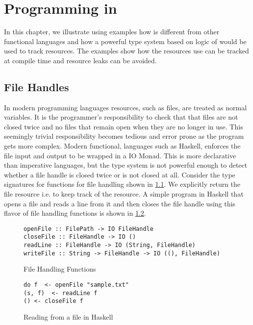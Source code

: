 \chapter{Programming in \qub{}}\label{chp:qub-programming}

In this chapter, we illustrate using examples how \qub{} is different
from other functional languages and how a powerful type system based on logic of \BI{}
would be used to track resources. The examples show how the resources use
can be tracked at compile time and resource leaks can be avoided.

\section{File Handles}\label{sec:file-handle-example}

In modern programming languages resources, such as files, are treated as normal variables.
It is the programmer's responsibility to check that that files are not closed twice
and no files that remain open when they are no longer in use. This seemingly trivial
responsibility becomes tedious and error prone as the program gets more complex.
Modern functional, languages such as Haskell, enforces the file input and output to be wrapped in a IO Monad.
This is more declarative than imperative languages, but the type system is not powerful enough
to detect whether a file handle is closed twice or is not closed at all.
Consider the type signatures for functions for file handling shown in \cref{fig:file-handling-function}. We explicitly
return the file resource i.e.  to keep track of the resource.
A simple program in Haskell that opens a file and reads a line from it and then closes the file handle using this
flavor of file handling functions is shown in \cref{fig:file-read-close}.

\begin{figure}[h]
  \begin{framed}
\begin{verbatim}
openFile :: FilePath -> IO FileHandle
closeFile :: FileHandle -> IO ()
readLine :: FileHandle -> IO (String, FileHandle)
writeFile :: String -> FileHandle -> IO ((), FileHandle)
\end{verbatim}
  \end{framed}
  \caption{File Handling Functions}
  \label{fig:file-handling-function}
\end{figure}

\begin{figure}[h]
  \begin{framed}
\begin{verbatim}
do f  <- openFile "sample.txt"
(s, f)  <- readLine f
() <- closeFile f
\end{verbatim}
  \end{framed}
  \caption{Reading from a file in Haskell}
  \label{fig:file-read-close}
\end{figure}


